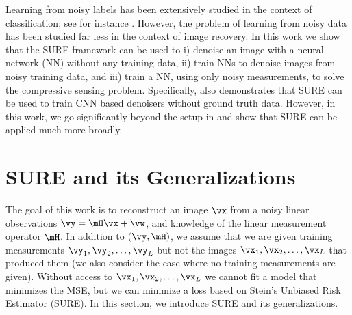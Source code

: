 \documentclass{article}
\newcommand\img{\vx}
\newcommand\obs{\vy}
\newcommand\noise{\vw}
\begin{document}
Learning from noisy labels has been extensively studied in the context of classification; see for instance  \cite{natarajan2013learning,xiao2015learning,liu2016classification,sukhbaatar2014training,sukhbaatar2014learning}. However, the problem of learning from noisy data has been studied far less in the context of image recovery. 
In this work we show that the SURE framework can be used to 
i) denoise an image with a neural network (NN) without any training data,
ii) train NNs to denoise images from noisy training data, and 
iii) train a NN, using only noisy measurements, to solve the compressive sensing problem. 
Specifically, \cite{MCSUREtraining} also demonstrates that SURE can be used to train CNN based denoisers without ground truth data. 
However, in this work, we go significantly beyond the setup in \cite{MCSUREtraining} and show that SURE can be applied much more broadly.
\section{SURE and its Generalizations}\label{sec:SURE}

The goal of this work is to reconstruct an image $\img$ from a noisy linear observations $\obs = \mH \img + \noise$, and knowledge of the linear measurement operator $\mH$. In addition to $(\obs,\mH)$, we assume that we are given training measurements $\obs_1,\obs_2,\ldots,\obs_L$ but not the images $\img_1,\img_2,\ldots,\img_L$ that produced them (we also consider the case where no training measurements are given). 
Without access to $\img_1,\img_2,\ldots,\img_L$ we cannot fit a model that minimizes the MSE, but we can minimize a loss based on Stein's Unbiased Risk Estimator (SURE).
In this section, we introduce SURE and its generalizations.
\end{document}
